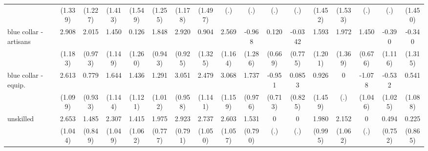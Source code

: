 {\begin{tabular}{l*{16}{c}}
                    &     (1.339)         &     (1.227)         &     (1.413)         &     (1.549)         &     (1.255)         &     (1.178)         &     (1.497)         &         (.)         &         (.)         &         (.)         &         (.)         &     (1.452)         &     (1.533)         &         (.)         &         (.)         &     (1.450)         \\
[1em]
blue collar - artisans&       2.908\sym{*}  &       2.015\sym{*}  &       1.450         &       0.126         &       1.848\sym{*}  &       2.920\sym{**} &       0.904         &       2.569\sym{*}  &      -0.968         &       0.120         &     -0.0342         &       1.593         &       1.972         &       1.450\sym{*}  &      -0.390         &      -0.340         \\
                    &     (1.183)         &     (0.973)         &     (1.149)         &     (1.260)         &     (0.943)         &     (0.925)         &     (1.325)         &     (1.164)         &     (1.286)         &     (0.669)         &     (0.775)         &     (1.201)         &     (1.369)         &     (0.676)         &     (1.116)         &     (1.315)         \\
[1em]
blue collar - equip.&       2.613\sym{*}  &       0.779         &       1.644         &       1.436         &       1.291         &       3.051\sym{**} &       2.479\sym{*}  &       3.068\sym{**} &       1.737         &      -0.951         &      0.0853         &       0.926         &           0         &      -1.078         &      -0.532         &       0.541         \\
                    &     (1.099)         &     (0.933)         &     (1.144)         &     (1.121)         &     (1.012)         &     (0.958)         &     (1.141)         &     (1.159)         &     (0.976)         &     (0.713)         &     (0.825)         &     (1.459)         &         (.)         &     (1.046)         &     (1.025)         &     (1.088)         \\
[1em]
unskilled           &       2.653\sym{*}  &       1.485         &       2.307\sym{*}  &       1.415         &       1.975\sym{*}  &       2.923\sym{***}&       2.737\sym{**} &       2.603\sym{*}  &       1.531         &           0         &           0         &       1.980\sym{*}  &       2.152\sym{*}  &           0         &       0.494         &       0.225         \\
                    &     (1.044)         &     (0.849)         &     (1.049)         &     (1.062)         &     (0.777)         &     (0.791)         &     (1.050)         &     (1.057)         &     (0.790)         &         (.)         &         (.)         &     (0.995)         &     (1.062)         &         (.)         &     (0.752)         &     (0.865)         \\

\end{tabular}}
